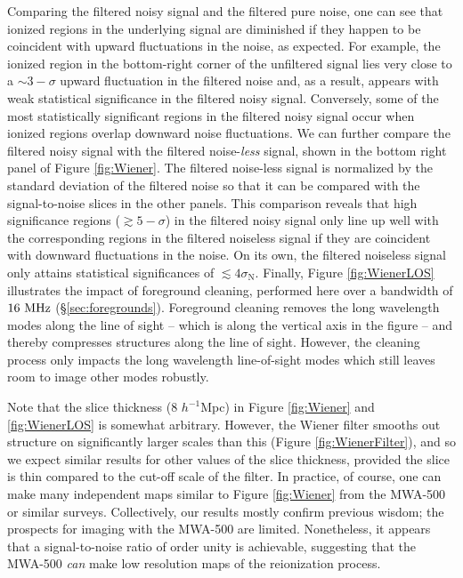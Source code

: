 Comparing the filtered noisy signal and the filtered pure noise,
one can see that ionized regions in the underlying signal are
diminished if they happen to be coincident with upward fluctuations 
in the noise, as expected. For example, the ionized region in the
bottom-right corner of the unfiltered signal lies very close to a
$\sim 3-\sigma$ upward fluctuation in the filtered noise and, as a
result, appears with weak statistical significance in the filtered
noisy signal. Conversely, some of the most statistically
significant regions in the filtered noisy signal occur when ionized
regions overlap downward noise fluctuations. 
We can further compare the filtered noisy signal with the filtered noise-{\em less} signal,
shown in the bottom right panel of Figure \ref{fig:Wiener}. The filtered noise-less signal
is normalized by the standard deviation of the filtered noise so that it can be compared
with the signal-to-noise slices in the other panels.
This comparison reveals that high significance regions ($\gtrsim 5-\sigma$) in the 
filtered noisy signal only
line up well with the corresponding regions in the filtered noiseless signal if they
are coincident with downward fluctuations in the noise.
On its own, the filtered noiseless signal only attains statistical significances of $\lesssim4\sigma_{\text{N}}$.
Finally, Figure \ref{fig:WienerLOS} illustrates the impact of
foreground cleaning, performed here over a bandwidth of $16 \ \text{MHz}$ (\S \ref{sec:foregrounds}). 
Foreground cleaning removes the long wavelength
modes along the line of sight -- which is along the vertical axis
in the figure -- and thereby compresses structures along the line of sight.
However, the cleaning process only impacts the long wavelength line-of-sight
modes which still leaves room to image other modes robustly.

Note that the slice thickness ($8$ $h^{-1}$Mpc) in Figure \ref{fig:Wiener} and \ref{fig:WienerLOS} is somewhat
arbitrary. However, the Wiener filter smooths out structure on significantly larger
scales than this (Figure \ref{fig:WienerFilter}), and so we expect
similar results for other values of the slice thickness, provided the
slice is thin compared to the cut-off scale of the filter. 
In practice, of course,
one can make many independent maps similar to Figure \ref{fig:Wiener} from
the MWA-500 or similar surveys. Collectively, our results mostly confirm
previous wisdom; the prospects for imaging with the MWA-500 are limited.
Nonetheless, it appears that a signal-to-noise ratio of order unity
is achievable,
suggesting that the MWA-500 {\em can} make low resolution maps of the reionization
process.



